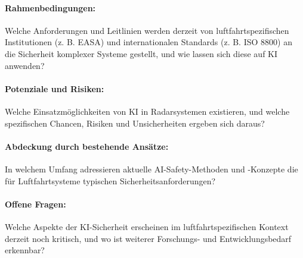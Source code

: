 \paragraph{Rahmenbedingungen:}
Welche Anforderungen und Leitlinien werden derzeit von luftfahrtspezifischen 
Institutionen (z. B. EASA) und internationalen Standards (z. B. ISO 8800) an die 
Sicherheit komplexer Systeme gestellt, und wie lassen sich diese auf KI anwenden?
\paragraph{Potenziale und Risiken:}
Welche Einsatzmöglichkeiten von KI in Radarsystemen existieren, und welche spezifischen 
Chancen, Risiken und Unsicherheiten ergeben sich daraus?
\paragraph{Abdeckung durch bestehende Ansätze:}
In welchem Umfang adressieren aktuelle AI-Safety-Methoden und -Konzepte die für 
Luftfahrtsysteme typischen Sicherheitsanforderungen?
\paragraph{Offene Fragen:}
Welche Aspekte der KI-Sicherheit erscheinen im luftfahrtspezifischen Kontext derzeit 
noch kritisch, und wo ist weiterer Forschungs- und Entwicklungsbedarf erkennbar?
